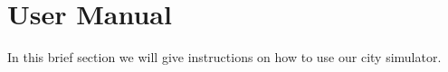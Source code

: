 \section{User Manual}

In this brief section we will give instructions on how to use our city
simulator.

